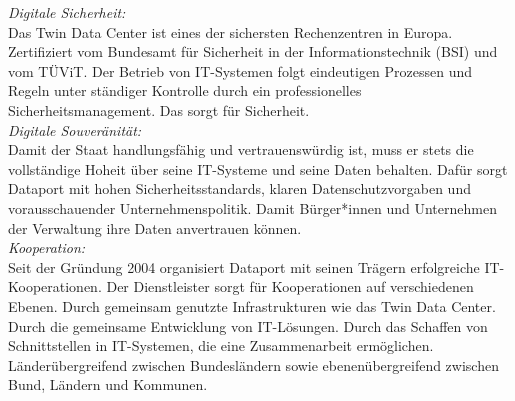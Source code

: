 \noindent
{\em Digitale Sicherheit:}\\
Das Twin Data Center ist eines der sichersten Rechenzentren in Europa. Zertifiziert vom Bundesamt für Sicherheit in der Informationstechnik (BSI) und vom TÜViT. Der Betrieb von IT-Systemen folgt eindeutigen Prozessen und Regeln unter ständiger Kontrolle durch ein professionelles Sicherheitsmanagement. Das sorgt für Sicherheit.\\
{\em Digitale Souveränität:}\\
Damit der Staat handlungsfähig und vertrauenswürdig ist, muss er stets die vollständige Hoheit über seine IT-Systeme und seine Daten behalten. Dafür sorgt Dataport mit hohen Sicherheitsstandards, klaren Datenschutzvorgaben und vorausschauender Unternehmenspolitik. Damit Bürger*innen und Unternehmen der Verwaltung ihre Daten anvertrauen können.\\
{\em Kooperation:}\\
Seit der Gründung 2004 organisiert Dataport mit seinen Trägern erfolgreiche IT-Kooperationen. Der Dienstleister sorgt für Kooperationen auf verschiedenen Ebenen. Durch gemeinsam genutzte Infrastrukturen wie das Twin Data Center. Durch die gemeinsame Entwicklung von IT-Lösungen. Durch das Schaffen von Schnittstellen in IT-Systemen, die eine Zusammenarbeit ermöglichen. Länderübergreifend zwischen Bundesländern sowie ebenenübergreifend zwischen Bund, Ländern und Kommunen.
